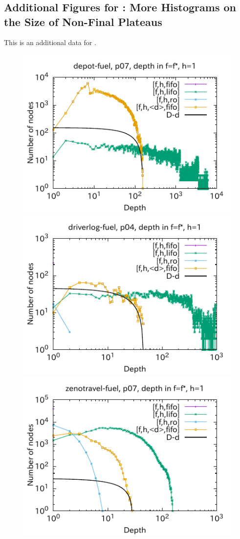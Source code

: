 \subsection{Additional Figures for : More Histograms on the Size of Non-Final Plateaus}

This is an additional data for .

\begin{figure}[htbp]
\includegraphics{img/output-lmcut/depot-fuel/p07-1.pdf}
\includegraphics{img/output-lmcut/driverlog-fuel/p04-1.pdf}
\includegraphics{img/output-lmcut/zenotravel-fuel/p07-1.pdf}

\end{figure}

